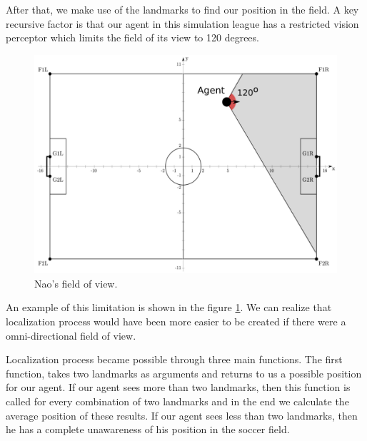 After that, we make use of the landmarks to find our position in the field. A key recursive factor is that 
our agent in this simulation league has a restricted vision perceptor which limits the field of its view to 120 degrees.
\begin{figure}[htb!]
\centering
  \includegraphics[scale=0.5]{Chapter3/figures/LViewAngle.pdf}
  \caption{Nao's field of view.} 
  \label{fig:fieldofview}
\end{figure}
An example of this limitation is shown in the figure \ref{fig:fieldofview}. We can realize that localization process would have been more easier to be created if there were a omni-directional field of view. 

Localization process became possible through three main functions. The first function, takes two landmarks as arguments and returns to us a possible position for our agent. If our agent sees more than two landmarks, then this function is called for every combination of two landmarks and in the end we calculate the average position of these results. If our agent sees less than two landmarks, then he has a complete unawareness of his position in the soccer field. 

